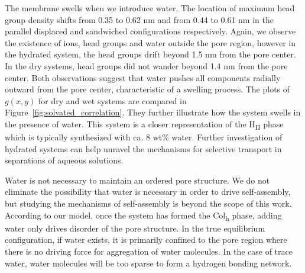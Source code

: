 \documentclass[journal=jpcbfk,manusciprt=article]{achemso}
\begin{document}
  The membrane swells when we introduce water. The location of maximum head
  group density shifts from 0.35 to 0.62 nm and from 0.44 to 0.61 nm in the
  parallel displaced and sandwiched configurations respectively. Again, we
  observe the existence of ions, head groups and water outside the pore region,
  however in the hydrated system, the head groups drift beyond 1.5 nm from the
  pore center. In the dry systems, head groups did not wander beyond 1.4 nm from
  the pore center. Both observations suggest that water pushes all components
  radially outward from the pore center, characteristic of a swelling process.
  The plots of $g(x,y)$ for dry and wet systems are compared in
  Figure~\ref{fig:solvated_correlation}. They further illustrate how the system
  swells in the presence of water. This system is a closer representation
  of the H\textsubscript{II} phase which is typically synthesized with ca. 8 wt\%
  water. Further investigation of hydrated systems can help unravel the
  mechanisms for selective transport in separations of aqueous solutions. 

  Water is not necessary to maintain an ordered pore structure. We do not
  eliminate the possibility that water is necessary in order to drive
  self-assembly, but studying the mechanisms of self-assembly is beyond the
  scope of this work. According to our model, once the system has formed the
  Col\textsubscript{h} phase, adding water only drives disorder of the pore
  structure. In the true equilibrium configuration, if water exists, it is
  primarily confined to the pore region where there is no driving force for
  aggregation of water molecules. In the case of trace water, water molecules
  will be too sparse to form a hydrogen bonding network.
\end{document}
